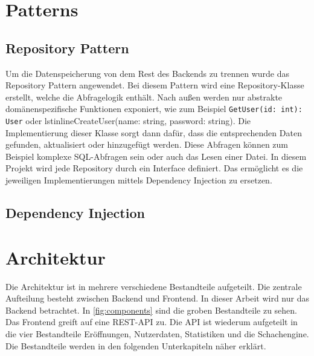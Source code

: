 \section{Patterns}

\subsection{Repository Pattern}
Um die Datenspeicherung von dem Rest des Backends zu trennen wurde das Repository Pattern angewendet. Bei diesem Pattern wird eine Repository-Klasse erstellt, welche die Abfragelogik enthält. Nach außen werden nur abstrakte domänenspezifische Funktionen exponiert, wie zum Beispiel \lstinline{GetUser(id: int): User} oder lstinline{CreateUser(name: string, password: string)}. Die Implementierung dieser Klasse sorgt dann dafür, dass die entsprechenden Daten gefunden, aktualisiert oder hinzugefügt werden. Diese Abfragen können zum Beispiel komplexe SQL-Abfragen sein oder auch das Lesen einer Datei. In diesem Projekt wird jede Repository durch ein Interface definiert. Das ermöglicht es die jeweiligen Implementierungen mittels Dependency Injection zu ersetzen. \cite{evans_domain-driven_2004}

\subsection{Dependency Injection}

\section{Architektur}
Die Architektur ist in mehrere verschiedene Bestandteile aufgeteilt. Die zentrale Aufteilung besteht zwischen Backend und Frontend. In dieser Arbeit wird nur das Backend betrachtet. In \autoref{fig:components} sind die groben Bestandteile zu sehen. Das Frontend greift auf eine \ac{REST}-API zu.
Die API ist wiederum aufgeteilt in die vier Bestandteile Eröffnungen, Nutzerdaten, Statistiken und die Schachengine.
Die Bestandteile werden in den folgenden Unterkapiteln näher erklärt.

